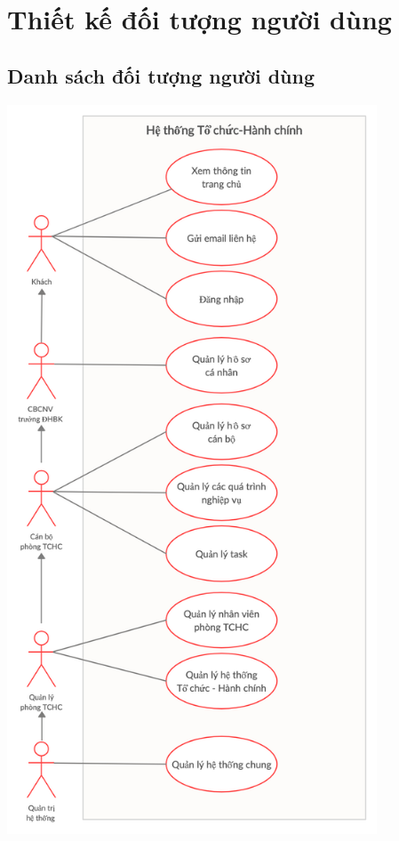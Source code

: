\section{Thiết kế đối tượng người dùng}
\subsection{Danh sách đối tượng người dùng}
\begin{center}
  \captionsetup{type=figure}
  \includegraphics[width=11cm]{img/usecase/rootUsecase.png}
\end{center}
